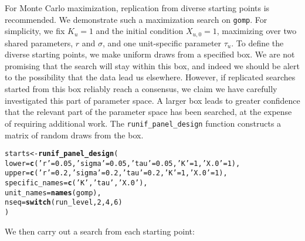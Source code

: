 \documentclass[12pt]{article}\usepackage[]{graphicx}\usepackage[table]{xcolor}
\makeatletter
\newcommand{\hlnum}[1]{\textcolor[rgb]{0.686,0.059,0.569}{#1}}%
\newcommand{\hlsng}[1]{\textcolor[rgb]{0.192,0.494,0.8}{#1}}%
\newcommand{\hldef}[1]{\textcolor[rgb]{0.345,0.345,0.345}{#1}}%
\newcommand{\hlkwb}[1]{\textcolor[rgb]{0.69,0.353,0.396}{#1}}%
\newcommand{\hlkwc}[1]{\textcolor[rgb]{0.333,0.667,0.333}{#1}}%
\newcommand{\hlkwd}[1]{\textcolor[rgb]{0.737,0.353,0.396}{\textbf{#1}}}%
\newenvironment{kframe}{%
 \def\at@end@of@kframe{}%
 \ifinner\ifhmode%
  \def\at@end@of@kframe{\end{minipage}}%
  \begin{minipage}{\columnwidth}%
 \fi\fi%
 \def\FrameCommand##1{\hskip\@totalleftmargin \hskip-\fboxsep
 \colorbox{shadecolor}{##1}\hskip-\fboxsep
     \hskip-\linewidth \hskip-\@totalleftmargin \hskip\columnwidth}%
 \MakeFramed {\advance\hsize-\width
   \@totalleftmargin\z@ \linewidth\hsize
   \@setminipage}}%
 {\par\unskip\endMakeFramed%
 \at@end@of@kframe}
\newenvironment{knitrout}{}{} %
\newcommand\code{\texttt}
\newcommand\unit{u} %
\makeatother
\begin{document}
For Monte Carlo maximization, replication from diverse starting points is recommended.
We demonstrate such a maximization search on \code{gomp}.
For simplicity, we fix $K_{\unit}=1$ and the initial condition $X_{\unit,0}=1$, maximizing over two shared parameters, $r$ and $\sigma$, and one unit-specific parameter $\tau_\unit$.
To define the diverse starting points, we make uniform draws from a specified box.
We are not promising that the search will stay within this box, and indeed we should be alert to the possibility that the data lead us elsewhere.
However, if replicated searches started from this box reliably reach a consensus, we claim we have carefully investigated this part of parameter space.
A larger box leads to greater confidence that the relevant part of the parameter space has been searched, at the expense of requiring additional work.
The \code{runif\_panel\_design} function constructs a matrix of random draws from the box.
\begin{knitrout}
\color{fgcolor}\begin{kframe}
\begin{alltt}
\hldef{starts} \hlkwb{<-} \hlkwd{runif_panel_design}\hldef{(}
  \hlkwc{lower} \hldef{=} \hlkwd{c}\hldef{(}\hlsng{'r'} \hldef{=} \hlnum{0.05}\hldef{,} \hlsng{'sigma'} \hldef{=} \hlnum{0.05}\hldef{,} \hlsng{'tau'} \hldef{=} \hlnum{0.05}\hldef{,} \hlsng{'K'} \hldef{=} \hlnum{1}\hldef{,} \hlsng{'X.0'} \hldef{=} \hlnum{1}\hldef{),}
  \hlkwc{upper} \hldef{=} \hlkwd{c}\hldef{(}\hlsng{'r'} \hldef{=}  \hlnum{0.2}\hldef{,} \hlsng{'sigma'} \hldef{=}  \hlnum{0.2}\hldef{,} \hlsng{'tau'} \hldef{=}  \hlnum{0.2}\hldef{,} \hlsng{'K'} \hldef{=} \hlnum{1}\hldef{,} \hlsng{'X.0'} \hldef{=} \hlnum{1}\hldef{),}
  \hlkwc{specific_names} \hldef{=} \hlkwd{c}\hldef{(}\hlsng{'K'}\hldef{,} \hlsng{'tau'}\hldef{,} \hlsng{'X.0'}\hldef{),}
  \hlkwc{unit_names} \hldef{=} \hlkwd{names}\hldef{(gomp),}
  \hlkwc{nseq}\hldef{=}\hlkwd{switch}\hldef{(run_level,}\hlnum{2}\hldef{,}\hlnum{4}\hldef{,}\hlnum{6}\hldef{)}
\hldef{)}
\end{alltt}
\end{kframe}
\end{knitrout}

We then carry out a search from each starting point:
\end{document}
